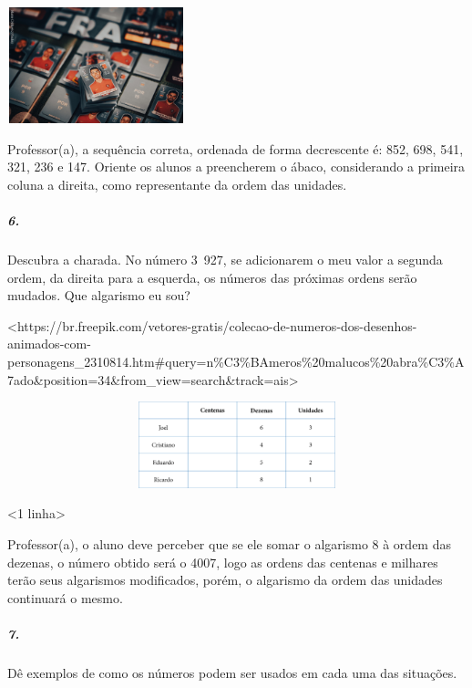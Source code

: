 \includegraphics[width=2.03125in,height=1.32438in]{media/image17.png}

Professor(a), a sequência correta, ordenada de forma decrescente é: 852,
698, 541, 321, 236 e 147. Oriente os alunos a preencherem o ábaco,
considerando a primeira coluna a direita, como representante da ordem
das unidades.

\subparagraph{6. }\label{section-5}

Descubra a charada. No número 3~927, se adicionarem o meu valor a
segunda ordem, da direita para a esquerda, os números das próximas
ordens serão mudados. Que algarismo eu sou?

\textless{}https://br.freepik.com/vetores-gratis/colecao-de-numeros-dos-desenhos-animados-com-personagens\_2310814.htm\#query=n\%C3\%BAmeros\%20malucos\%20abra\%C3\%A7ado\&position=34\&from\_view=search\&track=ais\textgreater{}

\includegraphics[width=5.90556in,height=0.98611in]{media/image18.png}

\textless{}1 linha\textgreater{}

Professor(a), o aluno deve perceber que se ele somar o algarismo 8 à
ordem das dezenas, o número obtido será o 4007, logo as ordens das
centenas e milhares terão seus algarismos modificados, porém, o
algarismo da ordem das unidades continuará o mesmo.

\subparagraph{7. }\label{section-6}

Dê exemplos de como os números podem ser usados em cada uma das
situações.


